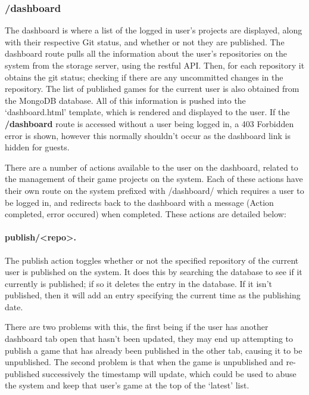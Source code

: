 	\subsubsection{/dashboard}
	The dashboard is where a list of the logged in user's projects are displayed, along with their respective Git status, and whether or not they are published. The dashboard route pulls all the information about the user's repositories on the system from the storage server, using the restful API. Then, for each repository it obtains the git status; checking if there are any uncommitted changes in the repository. The list of published games for the current user is also obtained from the MongoDB database. All of this information is pushed into the `dashboard.html' template, which is rendered and displayed to the user. If the \textbf{/dashboard} route is accessed without a user being logged in, a 403 Forbidden error is shown, however this normally shouldn't occur as the dashboard link is hidden for guests.

	There are a number of actions available to the user on the dashboard, related to the management of their game projects on the system. Each of these actions have their own route on the system prefixed with /dashboard/ which requires a user to be logged in, and redirects back to the dashboard with a message (Action completed, error occured) when completed. These actions are detailed below:


	\paragraph{publish/<repo>.}
	The publish action toggles whether or not the specified repository of the current user is published on the system. It does this by searching the database to see if it currently is published; if so it deletes the entry in the database. If it isn't published, then it will add an entry specifying the current time as the publishing date.

	There are two problems with this, the first being if the user has another dashboard tab open that hasn't been updated, they may end up attempting to publish a game that has already been published in the other tab, causing it to be unpublished. The second problem is that when the game is unpublished and re-published successively the timestamp will update, which could be used to abuse the system and keep that user's game at the top of the `latest' list.

